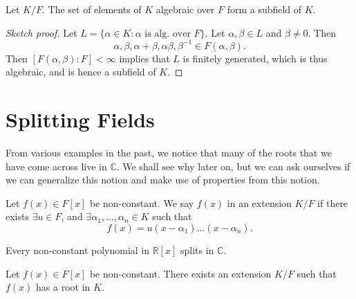 \documentclass[notoc,notitlepage]{tufte-book}
\begin{document}
\begin{propo}\label{propo:algebraic_numbers_form_a_subfield}
  Let $K / F$. The set of elements of $K$ algebraic over $F$ form a subfield of $K$.
\end{propo}

\begin{proof}[Sketch proof]
  Let $L = \{ \alpha \in K : \alpha \text{ is alg. over } F \}$. Let $\alpha, \beta \in L$ and $\beta \neq 0$.
  Then
  \begin{equation*}
    \alpha, \beta, \alpha + \beta, \alpha \beta, \beta^{-1} \in F(\alpha, \beta).
  \end{equation*}
  Then $[F(\alpha, \beta) : F] < \infty$ implies that $L$ is finitely generated, which is thus
  algebraic, and is hence a subfield of $K$.
\end{proof}



\section{Splitting Fields}%
\label{sec:splitting_fields}

From various examples in the past, we notice that many of the roots that we have come across
live in $\mathbb{C}$. We shall see why later on, but we can ask ourselves if we can generalize
this notion and make use of properties from this notion.

\begin{defn}[Splits]\label{defn:splits}
  Let $f(x) \in F[x]$ be non-constant. We say $f(x)$  in an extension $K/F$ if
  there exists $\exists u \in F$, and $\exists \alpha_1, \ldots, \alpha_n \in K$ such that
  \begin{equation*}
    f(x) = u(x - \alpha_1) \hdots (x - \alpha_n).
  \end{equation*}
\end{defn}

\begin{eg}
  Every non-constant polynomial in $\mathbb{R}[x]$ splits in $\mathbb{C}$.
\end{eg}

\begin{thm}\label{thm:kronecker_s_theorem}
  Let $f(x) \in F[x]$ be non-constant. There exists an extension $K / F$ such that $f(x)$ has
  a root in $K$.
\end{thm}
\end{document}
